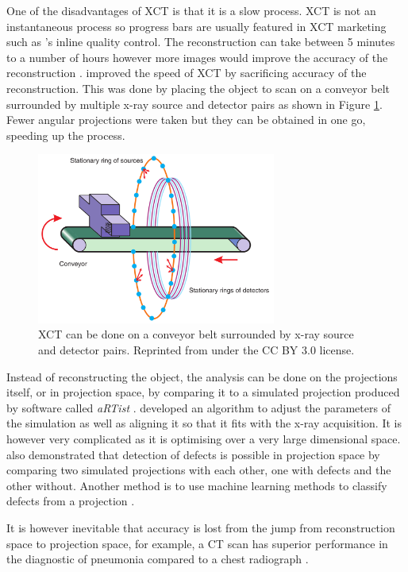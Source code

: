 One of the disadvantages of XCT is that it is a slow process. XCT is not an instantaneous process so progress bars are usually featured in XCT marketing such as \cite{nikon2015inline}'s inline quality control. The reconstruction can take between 5 minutes to a number of hours \citep{warnett2016towards} however more images would improve the accuracy of the reconstruction \citep{kruth2011computed}. \cite{warnett2016towards} improved the speed of XCT by sacrificing accuracy of the reconstruction. This was done by placing the object to scan on a conveyor belt surrounded by multiple x-ray source and detector pairs as shown in Figure \ref{fig:literature_conveyor}. Fewer angular projections were taken but they can be obtained in one go, speeding up the process.

\begin{figure}
  \centering
  \includegraphics[width=0.7\textwidth]{../figures/literatureReview/literature_conveyor.png}
  \caption{XCT can be done on a conveyor belt surrounded by x-ray source and detector pairs. Reprinted from \cite{warnett2016towards} under the CC BY 3.0 license.}
  \label{fig:literature_conveyor}
\end{figure}

Instead of reconstructing the object, the analysis can be done on the projections itself, or in projection space, by comparing it to a simulated projection produced by software called \emph{aRTist} \citep{bellon2007artist, jaenisch2008artist, bellon2012radiographic}. \cite{brierley2018optimized} developed an algorithm to adjust the parameters of the simulation as well as aligning it so that it fits with the x-ray acquisition. It is however very complicated as it is optimising over a very large dimensional space. \cite{brierley2018optimized} also demonstrated that detection of defects is possible in projection space by comparing two simulated projections with each other, one with defects and the other without. Another method is to use machine learning methods to classify defects from a projection \citep{rale2009comparison}.

It is however inevitable that accuracy is lost from the jump from reconstruction space to projection space, for example, a CT scan has superior performance in the diagnostic of pneumonia compared to a chest radiograph \citep{hayden2009chest}.
